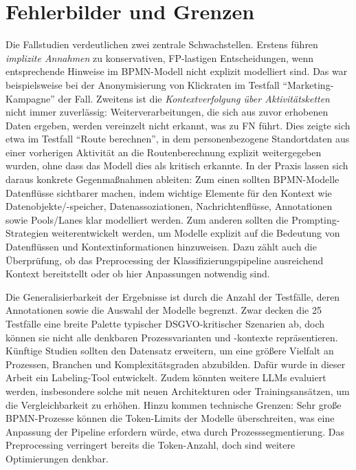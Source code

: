 \section{Fehlerbilder und Grenzen}\label{sec:fehlerbilder-und-grenzen}

Die Fallstudien verdeutlichen zwei zentrale Schwachstellen. Erstens führen \emph{implizite Annahmen} zu konservativen, \ac{FP}-lastigen Entscheidungen, wenn entsprechende Hinweise im \ac{BPMN}-Modell nicht explizit modelliert sind. Das war beispielsweise bei der Anonymisierung von Klickraten im Testfall \enquote{Marketing-Kampagne} der Fall. Zweitens ist die \emph{Kontextverfolgung über Aktivitätsketten} nicht immer zuverlässig: Weiterverarbeitungen, die sich aus zuvor erhobenen Daten ergeben, werden vereinzelt nicht erkannt, was zu \ac{FN} führt. Dies zeigte sich etwa im Testfall \enquote{Route berechnen}, in dem personenbezogene Standortdaten aus einer vorherigen Aktivität an die Routenberechnung explizit weitergegeben wurden, ohne dass das Modell dies als kritisch erkannte. In der Praxis lassen sich daraus konkrete Gegenmaßnahmen ableiten: Zum einen sollten \ac{BPMN}-Modelle Datenflüsse sichtbarer machen, indem wichtige Elemente für den Kontext wie Datenobjekte/-speicher, Datenassoziationen, Nachrichtenflüsse, Annotationen sowie Pools/Lanes klar modelliert werden. Zum anderen sollten die Prompting-Strategien weiterentwickelt werden, um Modelle explizit auf die Bedeutung von Datenflüssen und Kontextinformationen hinzuweisen. Dazu zählt auch die Überprüfung, ob das Preprocessing der Klassifizierungspipeline ausreichend Kontext bereitstellt oder ob hier Anpassungen notwendig sind.

Die Generalisierbarkeit der Ergebnisse ist durch die Anzahl der Testfälle, deren Annotationen sowie die Auswahl der Modelle begrenzt. Zwar decken die 25 Testfälle eine breite Palette typischer \ac{DSGVO}-kritischer Szenarien ab, doch können sie nicht alle denkbaren Prozessvarianten und -kontexte repräsentieren. Künftige Studien sollten den Datensatz erweitern, um eine größere Vielfalt an Prozessen, Branchen und Komplexitätsgraden abzubilden. Dafür wurde in dieser Arbeit ein Labeling-Tool entwickelt. Zudem könnten weitere \acp{LLM} evaluiert werden, insbesondere solche mit neuen Architekturen oder Trainingsansätzen, um die Vergleichbarkeit zu erhöhen. Hinzu kommen technische Grenzen: Sehr große \ac{BPMN}-Prozesse können die Token-Limits der Modelle überschreiten, was eine Anpassung der Pipeline erfordern würde, etwa durch Prozesssegmentierung. Das Preprocessing verringert bereits die Token-Anzahl, doch sind weitere Optimierungen denkbar.

